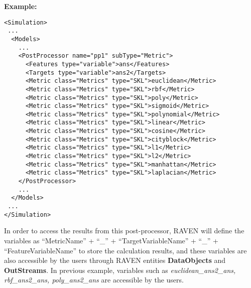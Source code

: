 \textbf{Example:}

\begin{lstlisting}[style=XML]
<Simulation>
 ...
  <Models>
    ...
    <PostProcessor name="pp1" subType="Metric">
      <Features type="variable">ans</Features>
      <Targets type="variable">ans2</Targets>
      <Metric class="Metrics" type="SKL">euclidean</Metric>
      <Metric class="Metrics" type="SKL">rbf</Metric>
      <Metric class="Metrics" type="SKL">poly</Metric>
      <Metric class="Metrics" type="SKL">sigmoid</Metric>
      <Metric class="Metrics" type="SKL">polynomial</Metric>
      <Metric class="Metrics" type="SKL">linear</Metric>
      <Metric class="Metrics" type="SKL">cosine</Metric>
      <Metric class="Metrics" type="SKL">cityblock</Metric>
      <Metric class="Metrics" type="SKL">l1</Metric>
      <Metric class="Metrics" type="SKL">l2</Metric>
      <Metric class="Metrics" type="SKL">manhattan</Metric>
      <Metric class="Metrics" type="SKL">laplacian</Metric>
    </PostProcessor>
    ...
  </Models>
 ...
</Simulation>
\end{lstlisting}

In order to access the results from this post-processor, RAVEN will define the variables as ``MetricName'' +
``\_'' + ``TargetVariableName'' + ``\_'' + ``FeatureVariableName'' to store the calculation results, and these
variables are also accessible by the users through RAVEN entities \textbf{DataObjects} and \textbf{OutStreams}.
In previous example, variables such as \textit{euclidean\_ans2\_ans, rbf\_ans2\_ans, poly\_ans2\_ans} are accessible
by the users.


